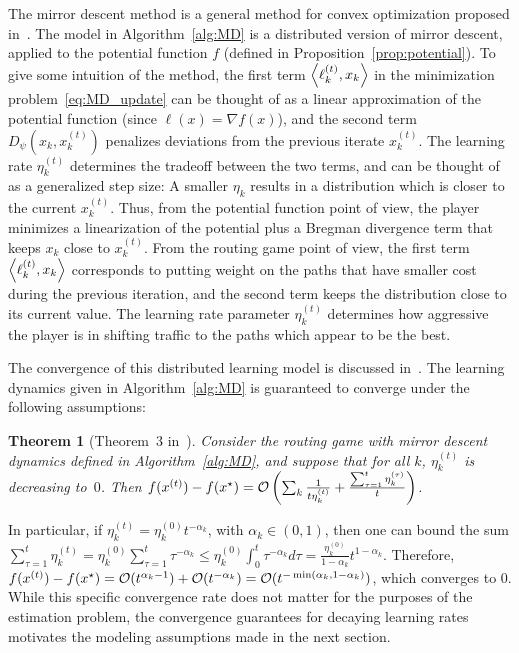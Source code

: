 \documentclass{sig-alternate-ipsn13}
\newtheorem{theorem}{Theorem}
\begin{document}
The mirror descent method is a general method for convex optimization proposed in~\cite{nemirovski1983problem}. The model in Algorithm~\ref{alg:MD} is a distributed version of mirror descent, applied to the potential function $f$ (defined in Proposition~\ref{prop:potential}). To give some intuition of the method, the first term $\left\langle \ell_k^{(t)}, x_k \right\rangle$ in the minimization problem~\eqref{eq:MD_update} can be thought of as a linear approximation of the potential function (since $\ell(x) = \nabla f(x)$), and the second term $D_\psi(x_k, x^{(t)}_k)$ penalizes deviations from the previous iterate $x_k^{(t)}$. The learning rate $\eta_k^{(t)}$ determines the tradeoff between the two terms, and can be thought of as a generalized step size: A smaller $\eta_k$ results in a distribution which is closer to the current $x_k^{(t)}$. Thus, from the potential function point of view, the player minimizes a linearization of the potential plus a Bregman divergence term that keeps $x_k$ close to $x_k^{(t)}$. From the routing game point of view, the first term $\left\langle \ell^{(t)}_k, x_k \right\rangle$ corresponds to putting weight on the paths that have smaller cost during the previous iteration, and the second term keeps the distribution close to its current value. The learning rate parameter $\eta^{(t)}_k$ determines how aggressive the player is in shifting traffic to the paths which appear to be the best.

The convergence of this distributed learning model is discussed in~\cite{krichene2015MD}. The learning dynamics given in Algorithm~\ref{alg:MD} is guaranteed to converge under the following assumptions:
\begin{theorem}[Theorem~3 in~\cite{krichene2015MD}]
\label{thm:convergence}
Consider the routing game with mirror descent dynamics defined in Algorithm~\ref{alg:MD}, and suppose that for all $k$, $\eta_k^{(t)}$ is decreasing to~$0$. Then $f(x^{(t)}) - f(x^\star) = \mathcal{O}\left( \sum_k \frac{1}{t\eta_k^{(t)}} + \frac{\sum_{\tau = 1}^t \eta_k^{(\tau)}}{t}  \right)$.
\end{theorem}

In particular, if $\eta_k^{(t)} = \eta^{(0)}_k t^{-\alpha_k}$, with $\alpha_k \in (0, 1)$, then one can bound the sum $\sum_{\tau = 1}^t \eta_k^{(t)} = \eta^{(0)}_k \sum_{\tau = 1}^t \tau^{-\alpha_k} \leq \eta^{(0)}_k \int_0^t \tau^{-\alpha_k} d\tau = \frac{\eta^{(0)}_k}{1-\alpha_k} t^{1-\alpha_k}$. Therefore, $f(x^{(t)}) - f(x^\star) = \mathcal{O}(t^{\alpha_k - 1}) + \mathcal{O}(t^{-\alpha_k}) = \mathcal{O}(t^{-\min(\alpha_k, 1-\alpha_k)})$, which converges to $0$. While this specific convergence rate does not matter for the purposes of the estimation problem, the convergence guarantees for decaying learning rates motivates the modeling assumptions made in the next section.
\end{document}
